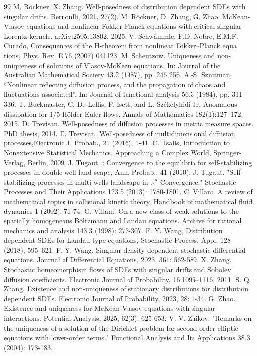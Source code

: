 \documentclass[10pt,a4paper]{amsart}
\numberwithin{equation}{section}
\begin{document}
\begin{thebibliography}{99}
 M. R\"ockner, X. Zhang. Well-posedness of distribution dependent SDEs with singular drifts. Bernoulli, 2021, 27(2).
 M. R\"ockner, D. Zhang, G. Zhao. McKean-Vlasov equations and nonlinear Fokker-Planck equations with critical singular Lorentz kernels. arXiv:2505.13802, 2025.
 V. Schwämmle, F.D. Nobre, E.M.F. Curado, Consequences of the H-theorem from nonlinear Fokker–Planck equa tions, Phys. Rev. E 76 (2007) 041123.
 M. Scheutzow. Uniqueness and non-uniqueness of solutions of Vlasov-McKean equations. In: Journal of the Australian Mathematical Society 43.2 (1987), pp. 246 256.
 A.-S. Sznitman. “Nonlinear reflecting diffusion process, and the propagation of chaos and fluctuations associated”. In: Journal of functional analysis 56.3 (1984), pp. 311–336.
 T. Buckmaster, C. De Lellis, P. Isett, and L. Sz{\'e}kelyhidi Jr. Anomalous dissipation for 1/5-H\"older Euler flows. Annals of Mathematics 182(1):127–172, 2015.
 D. Trevisan. Well-posedness of diffusion processes in metric measure spaces. PhD thesis, 2014.
 D. Trevisan. Well-posedness of multidimensional diffusion processes,Electronic J. Probab., 21 (2016), 1-41.
 C. Tsalis, Introduction to Nonextensive Statistical Mechanics. Approaching a Complex World, Springer-Verlag, Berlin, 2009.
 J. Tugaut. : Convergence to the equilibria for self-stabilizing processes in double well land scape, Ann. Probab., 41 (2010).
 J. Tugaut. "Self-stabilizing processes in multi-wells landscape in $\mathbb{R}^d$-Convergence." Stochastic Processes and Their Applications 123.5 (2013): 1780-1801.
 C. Villani. A review of mathematical topics in collisional kinetic theory. Handbook of mathematical fluid dynamics 1 (2002): 71-74.
 C. Villani. On a new class of weak solutions to the spatially homogeneous Boltzmann and Landau equations. Archive for rational mechanics and analysis 143.3 (1998): 273-307.
 F. Y. Wang, Distribution dependent SDEs for Landau type equations, Stochastic Process. Appl. 128 (2018), 595–621.
 F.-Y. Wang. Singular density dependent stochastic differential equations. Journal of Differential Equations, 2023, 361: 562-589.
 X. Zhang. Stochastic homeomorphism flows of SDEs with singular drifts and Sobolev diffusion coefficients. Electronic Journal of Probability, 16:1096–1116, 2011.
 S. Q. Zhang. Existence and non-uniqueness of stationary distributions for distribution dependent SDEs. Electronic Journal of Probability, 2023, 28: 1-34.
 G. Zhao. Existence and uniqueness for McKean-Vlasov equations with singular interactions. Potential Analysis, 2025, 62(3): 625-653.
 V. V. Zhikov. "Remarks on the uniqueness of a solution of the Dirichlet problem for second-order elliptic equations with lower-order terms." Functional Analysis and Its Applications 38.3 (2004): 173-183.
\end{thebibliography}
\end{document}
